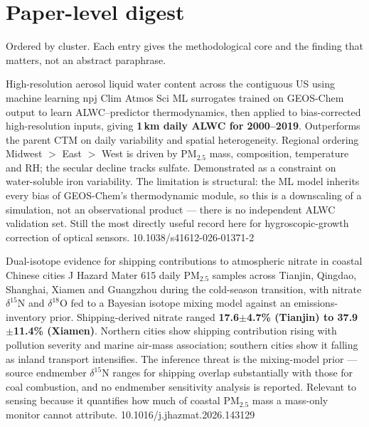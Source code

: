 \documentclass[10pt]{article}
\begin{document}
\section*{\sffamily\bfseries\color{Deep}Paper-level digest}
\vspace{-1.5mm}{\color{Amber}\rule{\linewidth}{1.1pt}}\vspace{1mm}

{\fontsize{7.4}{9}\selectfont\color{Slate}Ordered by cluster. Each entry gives the
methodological core and the finding that matters, not an abstract paraphrase.\par}


{High-resolution aerosol liquid water content across the contiguous US using machine learning}
{npj Clim Atmos Sci}
{ML surrogates trained on GEOS-Chem output to learn ALWC--predictor thermodynamics, then
applied to bias-corrected high-resolution inputs, giving \textbf{1\,km daily ALWC for
2000--2019}. Outperforms the parent CTM on daily variability and spatial heterogeneity.
Regional ordering Midwest $>$ East $>$ West is driven by PM$_{2.5}$ mass, composition,
temperature and RH; the secular decline tracks sulfate. Demonstrated as a constraint on
water-soluble iron variability. The limitation is structural: the ML model inherits every
bias of GEOS-Chem's thermodynamic module, so this is a downscaling of a simulation, not
an observational product --- there is no independent ALWC validation set. Still the most
directly useful record here for hygroscopic-growth correction of optical sensors.}
{10.1038/s41612-026-01371-2}

{Dual-isotope evidence for shipping contributions to atmospheric nitrate in coastal Chinese cities}
{J Hazard Mater}
{615 daily PM$_{2.5}$ samples across Tianjin, Qingdao, Shanghai, Xiamen and Guangzhou
during the cold-season transition, with nitrate $\delta^{15}$N and $\delta^{18}$O fed to
a Bayesian isotope mixing model against an emissions-inventory prior. Shipping-derived
nitrate ranged \textbf{17.6$\pm$4.7\% (Tianjin) to 37.9$\pm$11.4\% (Xiamen)}. Northern
cities show shipping contribution rising with pollution severity and marine air-mass
association; southern cities show it falling as inland transport intensifies. The
inference threat is the mixing-model prior --- source endmember $\delta^{15}$N ranges for
shipping overlap substantially with those for coal combustion, and no endmember
sensitivity analysis is reported. Relevant to sensing because it quantifies how much of
coastal PM$_{2.5}$ mass a mass-only monitor cannot attribute.}
{10.1016/j.jhazmat.2026.143129}
\end{document}
